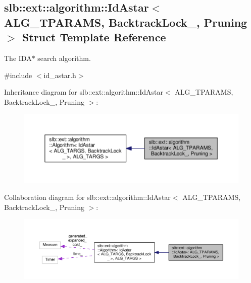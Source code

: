 \hypertarget{structslb_1_1ext_1_1algorithm_1_1IdAstar}{}\subsection{slb\+:\+:ext\+:\+:algorithm\+:\+:Id\+Astar$<$ A\+L\+G\+\_\+\+T\+P\+A\+R\+A\+MS, Backtrack\+Lock\+\_\+, Pruning $>$ Struct Template Reference}
\label{structslb_1_1ext_1_1algorithm_1_1IdAstar}


The {\ttfamily I\+D\+A$\ast$} search algorithm.  




{\ttfamily \#include $<$id\+\_\+astar.\+h$>$}



Inheritance diagram for slb\+:\+:ext\+:\+:algorithm\+:\+:Id\+Astar$<$ A\+L\+G\+\_\+\+T\+P\+A\+R\+A\+MS, Backtrack\+Lock\+\_\+, Pruning $>$\+:\nopagebreak
\begin{figure}[H]
\begin{center}
\leavevmode
\includegraphics[width=350pt]{structslb_1_1ext_1_1algorithm_1_1IdAstar__inherit__graph}
\end{center}
\end{figure}


Collaboration diagram for slb\+:\+:ext\+:\+:algorithm\+:\+:Id\+Astar$<$ A\+L\+G\+\_\+\+T\+P\+A\+R\+A\+MS, Backtrack\+Lock\+\_\+, Pruning $>$\+:\nopagebreak
\begin{figure}[H]
\begin{center}
\leavevmode
\includegraphics[width=350pt]{structslb_1_1ext_1_1algorithm_1_1IdAstar__coll__graph}
\end{center}
\end{figure}
